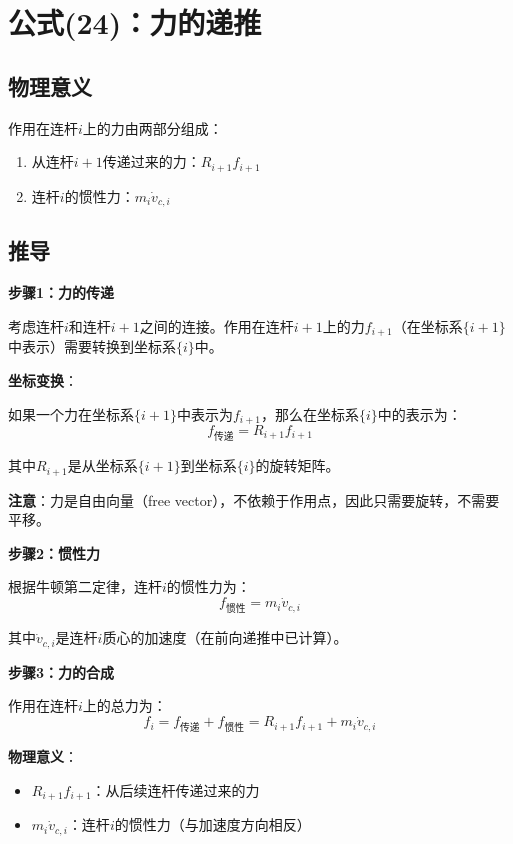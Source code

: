\documentclass[12pt,a4paper]{article}
\begin{document}
\section{公式(24)：力的递推}

\subsection{物理意义}

作用在连杆$i$上的力由两部分组成：
\begin{enumerate}
\item 从连杆$i+1$传递过来的力：$R_{i+1} f_{i+1}$
\item 连杆$i$的惯性力：$m_i \dot{v}_{c,i}$
\end{enumerate}

\subsection{推导}

\textbf{步骤1：力的传递}

考虑连杆$i$和连杆$i+1$之间的连接。作用在连杆$i+1$上的力$f_{i+1}$（在坐标系$\{i+1\}$中表示）需要转换到坐标系$\{i\}$中。

\textbf{坐标变换}：

如果一个力在坐标系$\{i+1\}$中表示为$f_{i+1}$，那么在坐标系$\{i\}$中的表示为：
\begin{equation}
f_{\text{传递}} = R_{i+1} f_{i+1}
\end{equation}

其中$R_{i+1}$是从坐标系$\{i+1\}$到坐标系$\{i\}$的旋转矩阵。

\textbf{注意}：力是自由向量（free vector），不依赖于作用点，因此只需要旋转，不需要平移。

\textbf{步骤2：惯性力}

根据牛顿第二定律，连杆$i$的惯性力为：
\begin{equation}
f_{\text{惯性}} = m_i \dot{v}_{c,i}
\end{equation}

其中$\dot{v}_{c,i}$是连杆$i$质心的加速度（在前向递推中已计算）。

\textbf{步骤3：力的合成}

作用在连杆$i$上的总力为：
\begin{equation}
f_i = f_{\text{传递}} + f_{\text{惯性}} = R_{i+1} f_{i+1} + m_i \dot{v}_{c,i} \tag{24}
\end{equation}

\textbf{物理意义}：
\begin{itemize}
\item $R_{i+1} f_{i+1}$：从后续连杆传递过来的力
\item $m_i \dot{v}_{c,i}$：连杆$i$的惯性力（与加速度方向相反）
\end{itemize}
\end{document}
